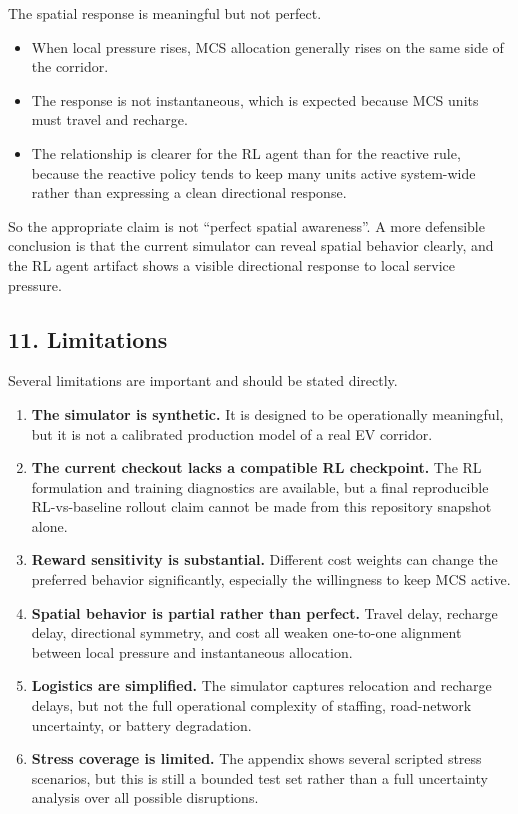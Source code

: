 \documentclass[11pt]{article}
\providecommand{\tightlist}{%
      \setlength{\itemsep}{0pt}\setlength{\parskip}{0pt}}
\begin{document}
    The spatial response is meaningful but not perfect.

\begin{itemize}
\tightlist
\item
  When local pressure rises, MCS allocation generally rises on the same
  side of the corridor.
\item
  The response is not instantaneous, which is expected because MCS units
  must travel and recharge.
\item
  The relationship is clearer for the RL agent than for the reactive
  rule, because the reactive policy tends to keep many units active
  system-wide rather than expressing a clean directional response.
\end{itemize}

So the appropriate claim is not ``perfect spatial awareness''. A more
defensible conclusion is that the current simulator can reveal spatial
behavior clearly, and the RL agent artifact shows a visible directional
response to local service pressure.

    \subsection{11. Limitations}\label{limitations}

Several limitations are important and should be stated directly.

\begin{enumerate}
\def\labelenumi{\arabic{enumi}.}
\tightlist
\item
  \textbf{The simulator is synthetic.} It is designed to be
  operationally meaningful, but it is not a calibrated production model
  of a real EV corridor.
\item
  \textbf{The current checkout lacks a compatible RL checkpoint.} The RL
  formulation and training diagnostics are available, but a final
  reproducible RL-vs-baseline rollout claim cannot be made from this
  repository snapshot alone.
\item
  \textbf{Reward sensitivity is substantial.} Different cost weights can
  change the preferred behavior significantly, especially the
  willingness to keep MCS active.
\item
  \textbf{Spatial behavior is partial rather than perfect.} Travel
  delay, recharge delay, directional symmetry, and cost all weaken
  one-to-one alignment between local pressure and instantaneous
  allocation.
\item
  \textbf{Logistics are simplified.} The simulator captures relocation
  and recharge delays, but not the full operational complexity of
  staffing, road-network uncertainty, or battery degradation.
\item
  \textbf{Stress coverage is limited.} The appendix shows several
  scripted stress scenarios, but this is still a bounded test set rather
  than a full uncertainty analysis over all possible disruptions.
\end{enumerate}
\end{document}
